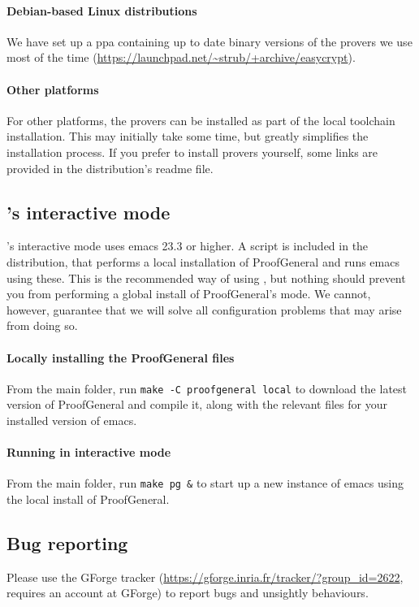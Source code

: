 \paragraph{Debian-based Linux distributions}
We have set up a ppa containing up to date binary versions of the provers we
use most of the time (\url{https://launchpad.net/~strub/+archive/easycrypt}).

\paragraph{Other platforms}
For other platforms, the provers can be installed as part of the local toolchain
installation. This may initially take some time, but greatly simplifies the
installation process. If you prefer to install provers yourself, some links are
provided in the distribution's readme file.

\subsection{\EasyCrypt's interactive mode}
\EasyCrypt's interactive mode uses emacs 23.3 or higher. A script is included in the
distribution, that performs a local installation of ProofGeneral and runs emacs
using these. This is the recommended way of using \EasyCrypt, but nothing should
prevent you from performing a global install of ProofGeneral's \EasyCrypt mode. We
cannot, however, guarantee that we will solve all configuration problems that
may arise from doing so.

\paragraph{Locally installing the ProofGeneral files}
From the main folder, run \texttt{make -C proofgeneral local} to download the
latest version of ProofGeneral and compile it, along with the relevant \EasyCrypt files
for your installed version of emacs.

\paragraph{Running \EasyCrypt in interactive mode}
From the main folder, run \texttt{make pg \&} to start up a new instance of emacs
using the local install of ProofGeneral.

\subsection{Bug reporting}
Please use the GForge tracker
(\url{https://gforge.inria.fr/tracker/?group_id=2622}, requires an account at
GForge) to report bugs and unsightly behaviours.


